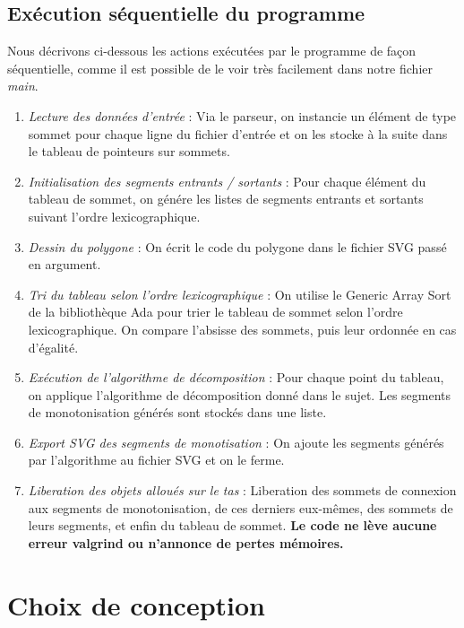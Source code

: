 \documentclass[10.9pt]{article}
\begin{document}
\newpage

\subsection{Exécution séquentielle du programme}
Nous décrivons ci-dessous les actions exécutées par le programme de
façon séquentielle, comme il est possible de le voir très facilement
dans notre fichier \emph{main}.

\begin{enumerate}
\item \emph{Lecture des données d'entrée} : Via le parseur, on
  instancie un élément de type sommet pour chaque ligne du fichier
  d'entrée et on les stocke à la suite dans le tableau de pointeurs sur sommets.
\item \emph{Initialisation des segments entrants / sortants} : Pour
  chaque élément du tableau de sommet, on génére les listes de
  segments entrants et sortants suivant l'ordre lexicographique.
\item \emph{Dessin du polygone} : On écrit le code du polygone dans le
  fichier SVG passé en argument.
\item \emph{Tri du tableau selon l'ordre lexicographique} : On utilise
  le Generic Array Sort de la bibliothèque Ada pour trier le tableau
  de sommet selon l'ordre lexicographique. On compare l'absisse des
  sommets, puis leur ordonnée en cas d'égalité.
\item \emph{Exécution de l'algorithme de décomposition} : Pour chaque
  point du tableau, on applique l'algorithme de décomposition donné
  dans le sujet. Les segments de monotonisation générés sont stockés
  dans une liste.
\item \emph{Export SVG des segments de monotisation} : On ajoute les
  segments générés par l'algorithme au fichier SVG et on le ferme.
\item \emph{Liberation des objets alloués sur le tas} : Liberation des
  sommets de connexion aux segments de monotonisation, de ces
  derniers eux-mêmes, des sommets de leurs segments, et enfin du
  tableau de sommet. \textbf{Le code ne lève aucune erreur valgrind ou
    n'annonce de pertes mémoires.}
\end{enumerate}

\section{Choix de conception}
\end{document}

